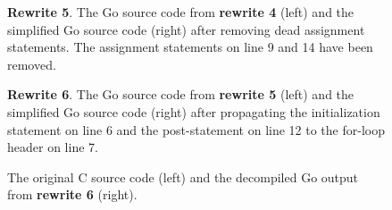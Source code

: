 \begin{figure}[htbp]
	\centering
	\begin{subfigure}[t]{0.45\textwidth}
		
	\end{subfigure}
	\qquad
	\begin{subfigure}[t]{0.45\textwidth}
		
	\end{subfigure}
	\caption{\textbf{Rewrite 5}. The Go source code from \textbf{rewrite 4} (left) and the simplified Go source code (right) after removing dead assignment statements. The assignment statements on line 9 and 14 have been removed.}
	\label{fig:rewrite_5}
\end{figure}

\begin{figure}[htbp]
	\centering
	\begin{subfigure}[t]{0.45\textwidth}
		
	\end{subfigure}
	\qquad
	\begin{subfigure}[t]{0.45\textwidth}
		
	\end{subfigure}
	\caption{\textbf{Rewrite 6}. The Go source code from \textbf{rewrite 5} (left) and the simplified Go source code (right) after propagating the initialization statement on line 6 and the post-statement on line 12 to the for-loop header on line 7.}
	\label{fig:rewrite_6}
\end{figure}

\begin{figure}[htbp]
	\centering
	\begin{subfigure}[t]{0.49\textwidth}
		
	\end{subfigure}
	\qquad
	\begin{subfigure}[t]{0.45\textwidth}
		
	\end{subfigure}
	\caption{The original C source code (left) and the decompiled Go output from \textbf{rewrite 6} (right).}
	\label{fig:example1_comparison}
\end{figure}
